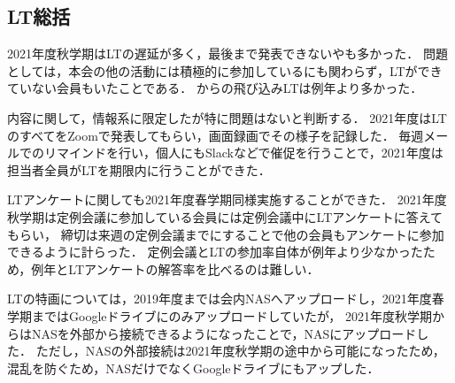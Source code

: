 \subsection*{LT総括}


2021年度秋学期はLTの遅延が多く，最後まで発表できない\firstGrade{}や\secondGrade{}も多かった．
問題としては，本会の他の活動には積極的に参加しているにも関わらず，LTができていない会員もいたことである．
\thirdGrade{}からの飛び込みLTは例年より多かった．

内容に関して，情報系に限定したが特に問題はないと判断する．
2021年度はLTのすべてをZoomで発表してもらい，画面録画でその様子を記録した．
毎週メールでのリマインドを行い，個人にもSlackなどで催促を行うことで，2021年度は担当者全員がLTを期限内に行うことができた．

LTアンケートに関しても2021年度春学期同様実施することができた．
2021年度秋学期は定例会議に参加している会員には定例会議中にLTアンケートに答えてもらい，
締切は来週の定例会議までにすることで他の会員もアンケートに参加できるように計らった．
定例会議とLTの参加率自体が例年より少なかったため，例年とLTアンケートの解答率を比べるのは難しい．

LTの特画については，2019年度までは会内NASへアップロードし，2021年度春学期まではGoogleドライブにのみアップロードしていたが，
2021年度秋学期からはNASを外部から接続できるようになったことで，NASにアップロードした．
ただし，NASの外部接続は2021年度秋学期の途中から可能になったため，混乱を防ぐため，NASだけでなくGoogleドライブにもアップした．

